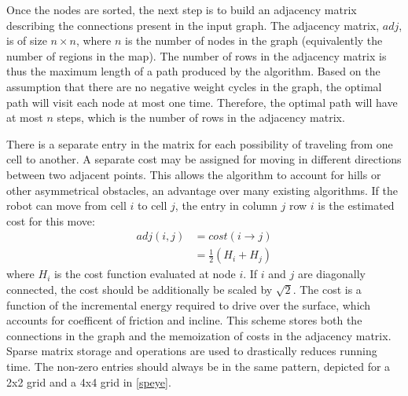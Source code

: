 \documentclass[journal]{IEEEtran}
\newcounter{row}
\newcounter{col}
\begin{document}
Once the nodes are sorted, the next step is to build an adjacency matrix describing the connections present in the input graph.
The adjacency matrix, $adj$, is of size $n \times n$, where $n$ is the number of nodes in the graph (equivalently the number of regions in the map). 
The number of rows in the adjacency matrix is thus the maximum length of a path produced by the algorithm.
Based on the assumption that there are no negative weight cycles in the graph, the optimal path will visit each node at most one time.
Therefore, the optimal path will have at most $n$ steps, which is the number of rows in the adjacency matrix. 

There is a separate entry in the matrix for each possibility of traveling from one cell to another.
A separate cost may be assigned for moving in different directions between  two adjacent points. 
This allows the algorithm to account for hills or other asymmetrical obstacles, an advantage over many existing algorithms.
If the robot can move from cell $i$ to cell $j$, the entry in column $j$ row $i$ is the estimated cost for this move:
\begin{align}
adj(i,j) &= cost(i \rightarrow j) \\
		 &= \frac{1}{2}(H_i + H_j)
\end{align}
where $H_i$ is the cost function evaluated at node $i$. If $i$ and $j$ are diagonally connected, the cost should be additionally be scaled by $\sqrt{2}$.
The cost is a function of the incremental energy required to drive over the surface, which accounts for coefficent of friction and incline.
This scheme stores both the connections in the graph and the memoization of costs in the adjacency matrix. 
Sparse matrix storage and operations are used to drastically reduces running time.
The non-zero entries should always be in the same pattern, depicted for a 2x2 grid and a 4x4 grid in \ref{speye}. 
\end{document}
